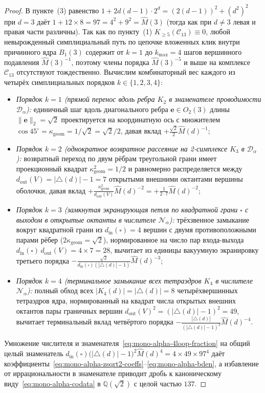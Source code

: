 \begin{proof}
В пункте~(3) равенство $1 + 2d(d-1)\cdot 2^d = (2(d-1))^2 + (d^2)^2$ при $d = 3$ даёт $1 + 12\times 8 = 97 = 4^2 + 9^2 = \widehat{M}(3)$ (тогда как при $d \ne 3$ левая и правая части различны). Так как по пункту~(1) $K_{\ge 5}(\mathcal{C}_{13}) \equiv 0$, любой невырожденный симплициальный путь по цепочке вложенных клик внутри причинного ядра $B_1(3)$ содержит от $k = 1$ до $k_{\max} = 4$ шагов вершинного подавления $\widehat{M}(3)^{-1}$, поэтому члены порядка $\widehat{M}(3)^{-5}$ и выше на комплексе $\mathcal{C}_{13}$ отсутствуют тождественно. Вычислим комбинаторный вес каждого из четырёх симплициальных порядков $k \in \{1, 2, 3, 4\}$:
\begin{itemize}[leftmargin=*,noitemsep]
\item \emph{Порядок $k = 1$ (прямой перенос вдоль ребра $K_2$ в знаменателе проводимости $\mathcal{D}_\alpha$):} единичный шаг вдоль диагонального ребра $\mathbf{e} \in O_2(3)$ длины $\|\mathbf{e}\|_2 = \sqrt{2}$ проектируется на координатную ось с множителем $\cos 45^\circ = \kappa_{\mathrm{geom}} = 1/\sqrt{2} = \sqrt{2}/2$, давая вклад $+\frac{\sqrt{2}}{2}\widehat{M}(d)^{-1}$;
\item \emph{Порядок $k = 2$ (однократное возвратное рассеяние на 2-симплексе $K_3$ в $\mathcal{D}_\alpha$):} возвратный переход по двум рёбрам треугольной грани имеет проекционный квадрат $\kappa_{\mathrm{geom}}^2 = 1/2$ и равномерно распределяется между $d_{\mathrm{out}}(V) = |{\triangle}(d)| - 1 = 7$ открытыми внешними октантами вершины оболочки, давая вклад $+\frac{\kappa_{\mathrm{geom}}^2}{d_{\mathrm{out}}(V)}\widehat{M}(d)^{-2} = +\frac{1}{2\cdot 7}\widehat{M}(d)^{-2}$;
\item \emph{Порядок $k = 3$ (замкнутая экранирующая петля по квадратной грани $\square$ с выходом в открытые октанты в числителе $\mathcal{N}_\alpha$):} трёхзвенное замыкание вокруг квадратной грани из $d_{\mathrm{in}}(\square) = 4$ вершин с двумя противоположными парами рёбер ($2\kappa_{\mathrm{geom}} = \sqrt{2}$), нормированное на число пар входа-выхода $d_{\mathrm{in}}(\square)\,d_{\mathrm{out}}(V) = 4 \times 7 = 28$, вычитает из единицы вакуумную экранировку третьего порядка $-\frac{\sqrt{2}}{d_{\mathrm{in}}(\square)(|{\triangle}(d)|-1)}\widehat{M}(d)^{-3}$;
\item \emph{Порядок $k = 4$ (терминальное замыкание всех тетраэдров $K_4$ в числителе $\mathcal{N}_\alpha$):} полный обход всех $|K_4(d)| = |{\triangle}(d)| = 8$ четырёхвершинных тетраэдров ядра, нормированный на квадрат числа открытых внешних октантов пары граничных вершин $d_{\mathrm{out}}(V)^2 = (|{\triangle}(d)| - 1)^2 = 49$, вычитает терминальный вклад четвёртого порядка $-\frac{|{\triangle}(d)|}{(|{\triangle}(d)|-1)^2}\widehat{M}(d)^{-4}$.
\end{itemize}
Умножение числителя и знаменателя~\eqref{eq:mono-alpha-4loop-fraction} на общий целый знаменатель $d_{\mathrm{in}}(\square)\bigl(|{\triangle}(d)|-1\bigr)^2\widehat{M}(d)^4 = 4 \times 49 \times 97^4$ даёт коэффициенты~\eqref{eq:mono-alpha-zsqrt2-coeffs}--\eqref{eq:mono-alpha-bden}, а избавление от иррациональности в знаменателе приводит дробь к каноническому виду~\eqref{eq:mono-alpha-codata} в $\mathbb{Q}(\sqrt{2})$ с целой частью $137$.
\end{proof}


